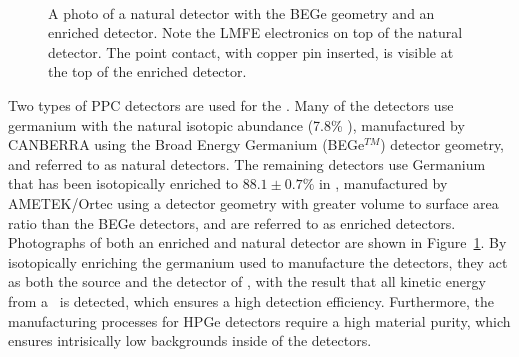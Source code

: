\documentclass[/main.tex]{subfiles}
\begin{document}
\begin{figure}[h]
  \centering
  ~
  \caption[Natural and enriched detector photos]{\label{fig:detphotos}
    A photo of a natural detector with the BEGe geometry and an enriched detector. Note the LMFE electronics on top of the natural detector. The point contact, with copper pin inserted, is visible at the top of the enriched detector.
  }
\end{figure}
Two types of PPC detectors are used for the \MJD.
Many of the detectors use germanium with the natural isotopic abundance (7.8\% ), manufactured by CANBERRA using the Broad Energy Germanium (BEGe$^{TM}$) detector geometry, and referred to as natural detectors.
The remaining detectors use Germanium that has been isotopically enriched to $88.1\pm0.7\%$ in \cite{mjdgeprocessing}, manufactured by AMETEK/Ortec using a detector geometry with greater volume to surface area ratio than the BEGe detectors, and are referred to as enriched detectors.
Photographs of both an enriched and natural detector are shown in Figure~\ref{fig:detphotos}.
By isotopically enriching the germanium used to manufacture the detectors, they act as both the source and the detector of \znbb, with the result that all kinetic energy from a \znbb\ is detected, which ensures a high detection efficiency.
Furthermore, the manufacturing processes for HPGe detectors require a high material purity, which ensures intrisically low backgrounds inside of the detectors.
\end{document}
